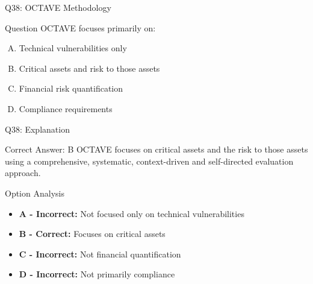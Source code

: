 \documentclass{beamer}
\begin{document}
	\begin{frame}{Q38: OCTAVE Methodology}
		\begin{block}{Question}
			OCTAVE focuses primarily on:
		\end{block}
		\begin{enumerate}[(A)]
			\item Technical vulnerabilities only
			\item Critical assets and risk to those assets
			\item Financial risk quantification
			\item Compliance requirements
		\end{enumerate}
	\end{frame}
	
	\begin{frame}{Q38: Explanation}
		\begin{block}{Correct Answer: B}
			OCTAVE focuses on critical assets and the risk to those assets using a comprehensive, systematic, context-driven and self-directed evaluation approach.
		\end{block}
		\begin{block}{Option Analysis}
			\begin{itemize}
				\item \textbf{A - Incorrect:} Not focused only on technical vulnerabilities
				\item \textbf{B - Correct:} Focuses on critical assets
				\item \textbf{C - Incorrect:} Not financial quantification
				\item \textbf{D - Incorrect:} Not primarily compliance
			\end{itemize}
		\end{block}
	\end{frame}
	
	
	
\end{document}
